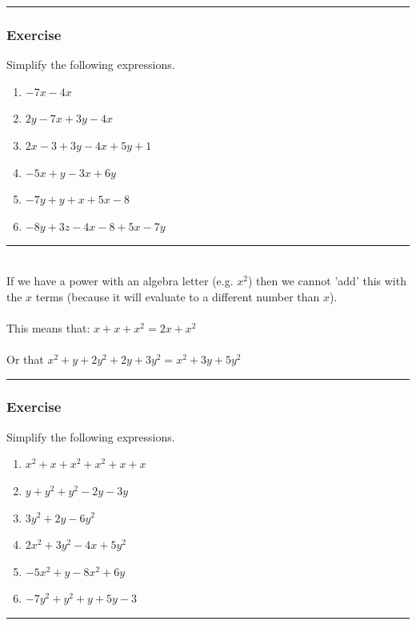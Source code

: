 \documentclass[a4paper,12pt]{article}
\newcommand\question{
	 \rule[0pt]{17cm}{0.5pt}\vspace{-0.5cm}
	\subsubsection{Exercise}

}
\newcommand\questionend{
	\rule[0pt]{17cm}{0.5pt}\vspace{0.0cm}\\
}
\begin{document}
\question
Simplify the following expressions.
\begin{multicols}{2}
	\begin{enumerate}[label=\normalsize \alph*)~~~ , topsep=8pt,itemsep=5pt,partopsep=4pt, parsep=4pt]
		\item $-7x - 4x$
		\item $2y -7x +3y - 4x$
		\item $2x-3+3y-4x +5y+1$
		\item $-5x+y-3x+6y$
		\item $-7y +y +x+5x -8$
		\item $-8y +3z -4x- 8 +5x -7y$
	\end{enumerate}
\end{multicols}\vspace{0.2cm}
\questionend
\newpage
If we have a power with an algebra letter (e.g. $x^2$) then we cannot 'add' this with the $x$ terms (because it will evaluate to a different number than $x$).\\\\
This means that: $x+ x + x^2 = 2x + x^2$\\\\
Or that $x^2 + y +2y^2 + 2y + 3y^2 = x^2 + 3y + 5y^2 $\\
\question
Simplify the following expressions.
\begin{multicols}{2}
	\begin{enumerate}[label=\normalsize \alph*)~~~, topsep=8pt,itemsep=12pt,partopsep=4pt, parsep=4pt]
		\item $x^2+x+x^2+x^2+x+x$
		\item $y+y^2+y^2-2y-3y$
		\item $3y^2+2y-6y^2$
		\item $2x^2+3y^2-4x +5y^2$
		\item $-5x^2+y-8x^2+6y$
		\item $-7y^2 +y^2+y+5y -3$
	\end{enumerate}
\end{multicols}\vspace{0.2cm}
\questionend
\end{document}
